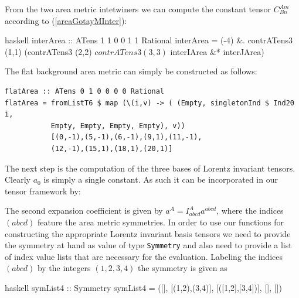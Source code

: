 \documentclass[a4paper,12pt, DIV=14, BCOR=5mm, twoside, headsepline]{scrbook}
\begin{document}
From the two area metric intetwiners we can compute the constant tensor $C^{Am}_{Bn}$ according to (\ref{areaGotayMInter}):

\begin{center}
\begin{cminted}{haskell}
interArea :: ATens 1 1 0 0 1 1 Rational
interArea = (-4) &. contrATens3 (1,1) (contrATens3 (2,2) $
            contrATens3 (3,3) $ interIArea &* interJArea)
\end{cminted}
\end{center}

The flat background area metric can simply be constructed as follows:

\begin{samepage}
\begin{verbatim}
flatArea :: ATens 0 1 0 0 0 0 Rational
flatArea = fromListT6 $ map (\(i,v) -> ( (Empty, singletonInd $ Ind20 i,
           Empty, Empty, Empty, Empty), v))
           [(0,-1),(5,-1),(6,-1),(9,1),(11,-1),
           (12,-1),(15,1),(18,1),(20,1)]
\end{verbatim} 
\end{samepage}

The next step is the computation of the three bases of Lorentz invariant tensors. Clearly $a_0$ is simply a single constant. As such it can be incorporated in our tensor framework by:

\begin{center}
\end{center}

The second expansion coefficient is given by $a^A = I^A_{abcd} a^{abcd}$, where the indices $(abcd)$ feature the area metric symmetries. In order to use our functions for constructing the appropriate Lorentz invariant basis tensors we need to provide the symmetry at hand as value of type \texttt{Symmetry} and also need to provide a list of index value lists that are necessary for the evaluation. Labeling the indices $(abcd)$ by the integers $(1,2,3,4)$ the symmetry is given as 

\begin{center}
\begin{cminted}{haskell}
symList4 :: Symmetry
symList4 = ([], [(1,2),(3,4)], [([1,2],[3,4])], [], [])
\end{cminted}
\end{center}
\end{document}
